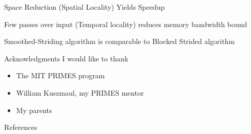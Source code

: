 \documentclass[x11names, svgnames, rgb]{beamer}
\begin{document}
\begin{frame}[t]{Space Reduction (Spatial Locality) Yields Speedup}
	\begin{figure}
		\begin{center}
			\serialtable
		\end{center}
	\end{figure}
\end{frame}
\begin{frame}[t]{Few passes over input (Temporal locality) reduces memory bandwidth bound}
	\begin{figure}
		\begin{center}
			\partitionbandwidthboundtable
		\end{center}
	\end{figure}
\end{frame}
\begin{frame}[t]{Smoothed-Striding algorithm is comparable to Blocked Strided algorithm}
	\begin{figure}
\begin{center}
		\CILKsorttable
\end{center}
	\end{figure}
\end{frame}

\begin{frame}[t]{Acknowledgments}
I would like to thank
\begin{itemize}
	\item {The MIT PRIMES program}
	\item {William Kuszmaul, my PRIMES mentor}
	\item {My parents}
\end{itemize}
\end{frame}

\begin{frame}[t]{References}
	 
	
\end{frame}
\end{document}

